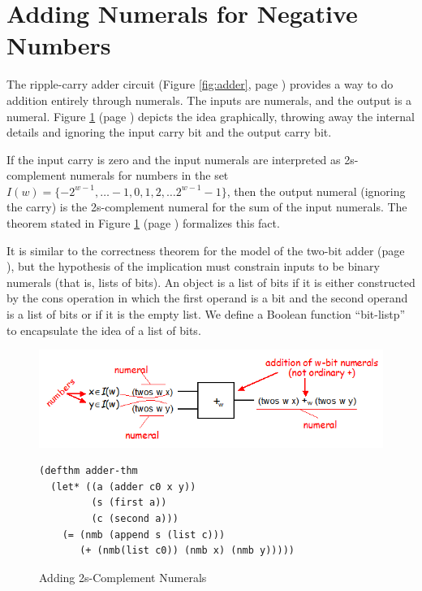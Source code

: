 \section{Adding Numerals for Negative Numbers}
\label{sec:adding-negative-numerals}

The ripple-carry adder circuit
(Figure \ref{fig:adder}, page \pageref{fig:adder})
provides a way to do addition entirely through numerals.
The inputs are numerals, and the output is a numeral.
Figure \ref{fig:adder-schematic} (page \pageref{fig:adder-schematic})
depicts the idea graphically,
throwing away the internal details
and ignoring the input carry bit and the output carry bit.

If the input carry is zero and
the input numerals are interpreted
as 2s-complement numerals for numbers in the set
$I(w) = \{-2^{w-1}, \dots -1, 0, 1, 2, \dots 2^{w-1}-1\}$,
then the output numeral (ignoring the carry) is the 2s-complement numeral
for the sum of the input numerals.
The theorem stated in
Figure \ref{fig:adder-schematic} (page \pageref{fig:adder-schematic})
formalizes this fact.

It is similar to the correctness theorem for the
model of the two-bit adder (page \pageref{adder2-ok}),
but the hypothesis of the implication must constrain
inputs to be binary numerals (that is, lists of bits).
An object is a list of bits if it is either
constructed by the cons operation in which the
first operand is a bit and the second operand
is a list of bits or if it is the empty list.
We define a Boolean function ``bit-listp'' to
encapsulate the idea of a list of bits.

\begin{figure}
\begin{center}
\includegraphics[scale=0.8]{Images/adder-schematic.png}
\begin{Verbatim}
(defthm adder-thm
  (let* ((a (adder c0 x y))
         (s (first a))
         (c (second a)))
    (= (nmb (append s (list c)))
       (+ (nmb(list c0)) (nmb x) (nmb y)))))
\end{Verbatim}
\end{center}
\caption{Adding 2s-Complement Numerals}
\label{fig:adder-schematic}
\end{figure}

